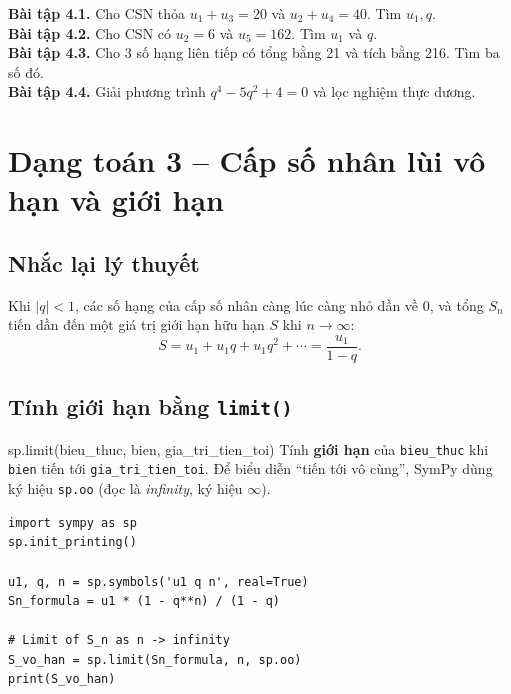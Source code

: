 \documentclass[12pt,a4paper]{report}
\begin{document}
\begin{exbox}
\textbf{Bài tập 4.1.} Cho CSN thỏa $u_1 + u_3 = 20$ và $u_2 + u_4 = 40$.
Tìm $u_1, q$.\\[2pt]
\textbf{Bài tập 4.2.} Cho CSN có $u_2 = 6$ và $u_5 = 162$. Tìm $u_1$ và
$q$.\\[2pt]
\textbf{Bài tập 4.3.} Cho 3 số hạng liên tiếp có tổng bằng 21 và tích
bằng 216. Tìm ba số đó.\\[2pt]
\textbf{Bài tập 4.4.} Giải phương trình $q^4 - 5q^2 + 4 = 0$ và lọc
nghiệm thực dương.
\end{exbox}

\newpage

\chapter{Dạng toán 3 -- Cấp số nhân lùi vô hạn và giới hạn}

\section{Nhắc lại lý thuyết}

Khi $|q| < 1$, các số hạng của cấp số nhân càng lúc càng nhỏ dần về 0,
và tổng $S_n$ tiến dần đến một giá trị giới hạn hữu hạn $S$ khi
$n \to \infty$:
\[
S = u_1 + u_1 q + u_1 q^2 + \cdots = \frac{u_1}{1 - q}.
\]

\section{Tính giới hạn bằng \texttt{limit()}}

\begin{syntaxbox}{sp.limit(bieu\_thuc, bien, gia\_tri\_tien\_toi)}
Tính \textbf{giới hạn} của \texttt{bieu\_thuc} khi \texttt{bien} tiến
tới \texttt{gia\_tri\_tien\_toi}. Để biểu diễn ``tiến tới vô cùng'',
SymPy dùng ký hiệu \texttt{sp.oo} (đọc là \emph{infinity}, ký hiệu
$\infty$).
\end{syntaxbox}

\begin{lstlisting}[caption={Tính tổng CSN lùi vô hạn bằng limit}]
import sympy as sp
sp.init_printing()

u1, q, n = sp.symbols('u1 q n', real=True)
Sn_formula = u1 * (1 - q**n) / (1 - q)

# Limit of S_n as n -> infinity
S_vo_han = sp.limit(Sn_formula, n, sp.oo)
print(S_vo_han)
\end{lstlisting}
\end{document}
